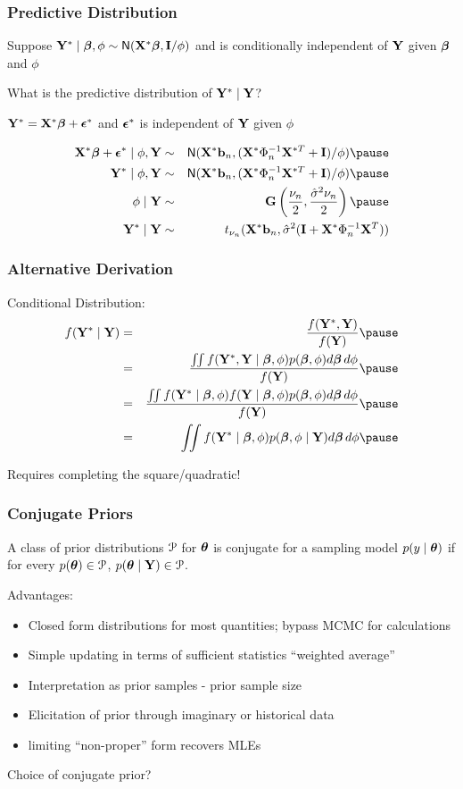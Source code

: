 \documentclass[]{beamer}
\begin{document}
\begin{frame}
  \frametitle{Predictive Distribution}
Suppose $\mathbf{Y}^* \mid \boldsymbol{\beta}, \phi \sim \textsf{N}(\mathbf{X}^* \boldsymbol{\beta} , \mathbf{I}/\phi)$  and is conditionally
independent of $\mathbf{Y}$ given $\boldsymbol{\beta}$ and $\phi$ \pause
\vspace{18pt}

What is the predictive distribution of $\mathbf{Y}^* \mid \mathbf{Y}$? \pause

\vspace{18pt}
$\mathbf{Y}^* = \mathbf{X}^* \boldsymbol{\beta} + \boldsymbol{\epsilon}^*$ and $\boldsymbol{\epsilon}^*$ is independent of $\mathbf{Y}$ given
$\phi$ \pause

\begin{eqnarray*}
\X^* \b + \eps^* \mid \phi, \Y & \sim & \N(\X^*\bv_n, (\X^{*} \Phi_n^{-1} \X^{*T}
+ \I)/\phi)  \pause \\
\Y^* \mid \phi, \Y & \sim & \N(\X^*\bv_n, (\X^{*} \Phi_n^{-1} \X^{*T}
+ \I)/\phi)  \pause \\
\phi \mid \Y & \sim & \G\left(\frac{\nu_n}{2},
  \frac{\shat \nu_n}{ 2} \right)  \pause \\
\Y^* \mid \Y & \sim & t_{\nu_n}( \X^*\bv_n, \shat (\I + \X^* \Phi_n^{-1} \X^T))
\end{eqnarray*}
\end{frame}
\begin{frame}
  \frametitle{Alternative Derivation}
Conditional Distribution:
\begin{eqnarray*}
f(\Y^* \mid \Y) & = & \frac{f(\Y^*, \Y)}{f(\Y)} \pause \\
 & = & \frac{
\iint f(\Y^*, \Y \mid \b, \phi) p(\b, \phi) d\b\, d\phi
}
{
  f(\Y)
}  \pause \\
 & = & \frac{
\iint f(\Y^*\mid \b, \phi) f(\Y \mid \b, \phi) p(\b, \phi) d\b\, d\phi
}
{
  f(\Y)
}  \pause \\
 & = &
\iint f(\Y^*\mid \b, \phi)  p(\b, \phi \mid \Y) d\b\, d\phi \pause
\end{eqnarray*}

Requires completing the square/quadratic!

\end{frame}

\begin{frame}
  \frametitle{Conjugate Priors}
  \begin{definition}
    A class of prior distributions ${\cal{P}}$ for $\boldsymbol{\theta}$ is conjugate for a
    sampling model $p(y \mid \boldsymbol{\theta})$ if for every $p(\boldsymbol{\theta}) \in {\cal{P}}$, $p(\boldsymbol{\theta}
    \mid \mathbf{Y}) \in {\cal{P}}$.
  \end{definition}
\pause
  Advantages: \pause
  \begin{itemize}
  \item Closed form distributions for most quantities; bypass MCMC for
    calculations \pause
  \item Simple updating in terms of sufficient statistics ``weighted
    average'' \pause
  \item Interpretation as prior samples - prior sample size \pause
  \item Elicitation of prior through imaginary or historical data \pause
  \item limiting ``non-proper'' form recovers MLEs \pause
  \end{itemize}
Choice of conjugate prior?
\end{frame}
\end{document}
